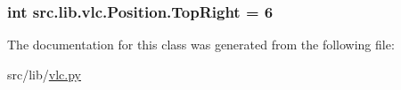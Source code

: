 \subsubsection[{Top\+Right}]{\setlength{\rightskip}{0pt plus 5cm}int src.\+lib.\+vlc.\+Position.\+Top\+Right = 6\hspace{0.3cm}{\ttfamily [static]}}\label{classsrc_1_1lib_1_1vlc_1_1Position_af9105f2d6bed5aee191e95074620f987}


The documentation for this class was generated from the following file\+:\begin{DoxyCompactItemize}
\item 
src/lib/\hyperlink{vlc_8py}{vlc.\+py}\end{DoxyCompactItemize}
